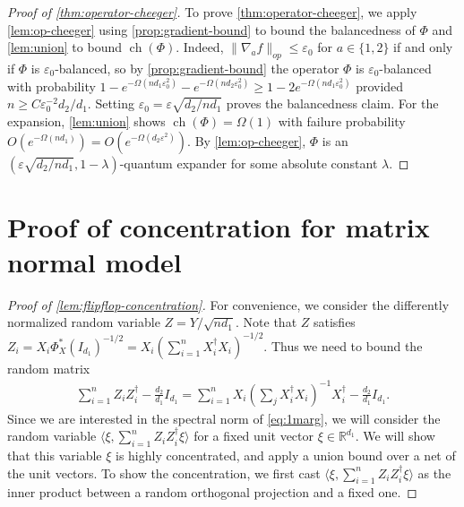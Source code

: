 \documentclass[aos]{imsart}
\theoremstyle{definition}
\numberwithin{equation}{section}
\DeclareMathOperator{\ch}{ch}
\newcommand{\R}{{\mathbb{R}}}
\newcommand{\eps}{\varepsilon}
\begin{document}
\begin{appendix}
\begin{proof}[Proof of \cref{thm:operator-cheeger}]
To prove \cref{thm:operator-cheeger}, we apply \cref{lem:op-cheeger} using \cref{prop:gradient-bound} to bound the balancedness of $\Phi$ and \cref{lem:union} to bound $\ch(\Phi)$. Indeed, $\|\nabla_a f\|_{op} \leq \eps_0$ for $a \in \{1,2\}$ if and only if $\Phi$ is $\eps_0$-balanced, so by \cref{prop:gradient-bound} the operator $\Phi$ is $\eps_0$-balanced with probability $1 -  e^{-\Omega(n d_1 \eps_0^2)} - e^{-\Omega(n d_2 \eps_0^2)} \geq 1 - 2e^{-\Omega(n d_1 \eps_0^2)}$ provided $n \geq C\eps_0^{-2} d_2/d_1 $. Setting $\eps_0 = \eps \sqrt{{d_2 }/{n d_1}}$ proves the balancedness claim. For the expansion, \cref{lem:union} shows $\ch(\Phi) = \Omega(1)$ with failure probability $O(e^{- \Omega(n d_1)}) = O(e^{- \Omega(d_2 \eps^2)})$. By \cref{lem:op-cheeger}, $\Phi$ is an $(\eps \sqrt{{d_2 }/{n d_1}}, 1 - \lambda)$-quantum expander for some absolute constant $\lambda$.
\end{proof}



\section{Proof of concentration for matrix normal model}\label{app:flipflop-concentration}

\begin{proof}[Proof of \cref{lem:flipflop-concentration}]
For convenience, we consider the differently normalized random variable $Z = Y/\sqrt{nd_1}$. Note that $Z$ satisfies
$Z_i = X_i \Phi_X^*(I_{d_1})^{-1/2} =  X_i (\sum_{i = 1}^n X_i^\dagger X_i)^{-1/2}.$ Thus we need to bound the random matrix
\begin{align} \sum_{i = 1}^n Z_i Z_i^{\dagger} - \frac{d_2}{d_1} I_{d_1} = \sum_{i = 1}^n X_i \left( \sum_{j}  X_i^{\dagger} X_i\right)^{-1} X_i^\dagger - \frac{d_2}{d_1} I_{d_1}.\label{eq:1marg}
\end{align}
Since we are interested in the spectral norm of \cref{eq:1marg}, we will consider the random variable $\langle \xi,  \sum_{i = 1}^n Z_i Z_i^{\dagger} \xi \rangle$ for a fixed unit vector $\xi \in \R^{d_1}$. We will show that this variable $\xi$ is highly concentrated, and apply a union bound over a net of the unit vectors. To show the concentration, we first cast $\langle \xi,  \sum_{i = 1}^n Z_i Z_i^{\dagger} \xi \rangle$ as the inner product between a random orthogonal projection and a fixed one.


\end{proof}
\end{appendix}
\end{document}

